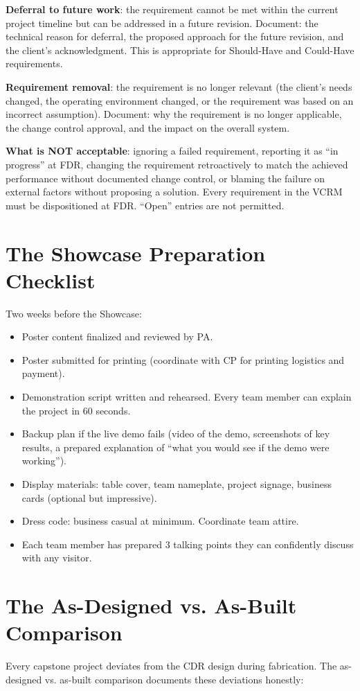 \textbf{Deferral to future work}: the requirement cannot be met within the current project timeline but can be addressed in a future revision. Document: the technical reason for deferral, the proposed approach for the future revision, and the client's acknowledgment. This is appropriate for Should-Have and Could-Have requirements.

\textbf{Requirement removal}: the requirement is no longer relevant (the client's needs changed, the operating environment changed, or the requirement was based on an incorrect assumption). Document: why the requirement is no longer applicable, the change control approval, and the impact on the overall system.

\textbf{What is NOT acceptable}: ignoring a failed requirement, reporting it as ``in progress'' at FDR, changing the requirement retroactively to match the achieved performance without documented change control, or blaming the failure on external factors without proposing a solution. Every requirement in the VCRM must be dispositioned at FDR. ``Open'' entries are not permitted.

\section{The Showcase Preparation Checklist}
Two weeks before the Showcase:
\begin{itemize}[nosep,leftmargin=1.5em]
\item Poster content finalized and reviewed by PA.
\item Poster submitted for printing (coordinate with CP for printing logistics and payment).
\item Demonstration script written and rehearsed. Every team member can explain the project in 60 seconds.
\item Backup plan if the live demo fails (video of the demo, screenshots of key results, a prepared explanation of ``what you would see if the demo were working'').
\item Display materials: table cover, team nameplate, project signage, business cards (optional but impressive).
\item Dress code: business casual at minimum. Coordinate team attire.
\item Each team member has prepared 3 talking points they can confidently discuss with any visitor.
\end{itemize}



\section{The As-Designed vs. As-Built Comparison}
Every capstone project deviates from the CDR design during fabrication. The as-designed vs. as-built comparison documents these deviations honestly:


